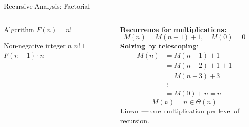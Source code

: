 \documentclass[aspectratio=169]{beamer}
\begin{document}
\begin{frame}[shrink=12]{Recursive Analysis: Factorial}
  \begin{columns}[T]
      \begin{block}{Algorithm $F(n) = n!$}
        \begin{algorithmic}[1]
          \Require Non-negative integer $n$
          \Ensure $n!$
           \Return $1$ \EndIf
          \State \Return $F(n-1) \cdot n$
        \end{algorithmic}
      \end{block}
      \vspace{0.3em}
      \textbf{Recurrence for multiplications:}
      \[
        M(n) = M(n-1) + 1, \quad M(0) = 0
      \]
      \textbf{Solving by telescoping:}
      \begin{align*}
        M(n) &= M(n-1) + 1 \\
             &= M(n-2) + 1 + 1 \\
             &= M(n-3) + 3 \\
             &\;\vdots \\
             &= M(0) + n = n
      \end{align*}
      \[
        \boxed{M(n) = n \in \Theta(n)}
      \]
      \vspace{0.2em}
      Linear — one multiplication per level of recursion.
  \end{columns}
\end{frame}
\end{document}
